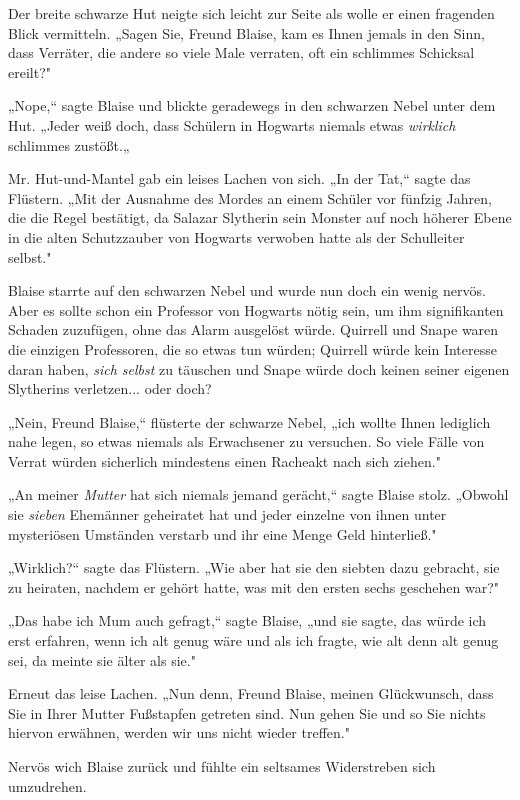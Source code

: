 {Der breite schwarze Hut neigte sich leicht zur Seite als wolle er einen fragenden Blick vermitteln. „Sagen Sie, Freund Blaise, kam es Ihnen jemals in den Sinn, dass Verräter, die andere so viele Male verraten, oft ein schlimmes Schicksal ereilt?"

„Nope,“ sagte Blaise und blickte geradewegs in den schwarzen Nebel unter dem Hut. „Jeder weiß doch, dass Schülern in Hogwarts niemals etwas \emph{wirklich} schlimmes zustößt.„

Mr. Hut-und-Mantel gab ein leises Lachen von sich. „In der Tat,“ sagte das Flüstern. „Mit der Ausnahme des Mordes an einem Schüler vor fünfzig Jahren, die die Regel bestätigt, da Salazar Slytherin sein Monster auf noch höherer Ebene in die alten Schutzzauber von Hogwarts verwoben hatte als der Schulleiter selbst."

Blaise starrte auf den schwarzen Nebel und wurde nun doch ein wenig nervös. Aber es sollte schon ein Professor von Hogwarts nötig sein, um ihm signifikanten Schaden zuzufügen, ohne das Alarm ausgelöst würde. Quirrell und Snape waren die einzigen Professoren, die so etwas tun würden; Quirrell würde kein Interesse daran haben, \emph{sich selbst} zu täuschen und Snape würde doch keinen seiner eigenen Slytherins verletzen... oder doch?

„Nein, Freund Blaise,“ flüsterte der schwarze Nebel, „ich wollte Ihnen lediglich nahe legen, so etwas niemals als Erwachsener zu versuchen. So viele Fälle von Verrat würden sicherlich mindestens einen Racheakt nach sich ziehen."

„An meiner \emph{Mutter} hat sich niemals jemand gerächt,“ sagte Blaise stolz. „Obwohl sie \emph{sieben} Ehemänner geheiratet hat und jeder einzelne von ihnen unter mysteriösen Umständen verstarb und ihr eine Menge Geld hinterließ."

„Wirklich?“ sagte das Flüstern. „Wie aber hat sie den siebten dazu gebracht, sie zu heiraten, nachdem er gehört hatte, was mit den ersten sechs geschehen war?"

„Das habe ich Mum auch gefragt,“ sagte Blaise, „und sie sagte, das würde ich erst erfahren, wenn ich alt genug wäre und als ich fragte, wie alt denn alt genug sei, da meinte sie älter als sie."

Erneut das leise Lachen. „Nun denn, Freund Blaise, meinen Glückwunsch, dass Sie in Ihrer Mutter Fußstapfen getreten sind. Nun gehen Sie und so Sie nichts hiervon erwähnen, werden wir uns nicht wieder treffen."

Nervös wich Blaise zurück und fühlte ein seltsames Widerstreben sich umzudrehen.

}
